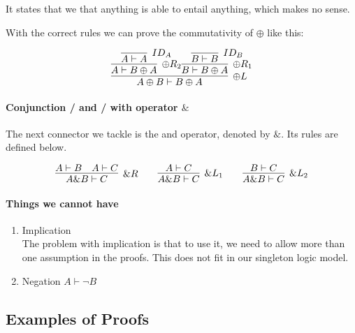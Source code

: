 \documentclass{article}
\begin{document}
It states that we that anything is able to entail anything, which makes no sense.

\medskip

With the correct rules we can prove  the commutativity of \(\oplus\) like this:

\[
\infer[{\oplus L}]
{A \oplus B \vdash B \oplus A}
{
	\infer[{\oplus R_2}]
	{A \vdash B \oplus A}
	{
		\infer[{ID_A}]
		{A \vdash A}
		{}
	}
	\infer[{\oplus R_1}]
	{B \vdash B \oplus A}
	{
		\infer[{ID_B}]
		{B \vdash B}
		{}
	}
}
\]



\paragraph{Conjunction / and / with operator \(\&\)}
The next connector we tackle is the and operator, denoted by \(\&\). Its rules are defined below. 

\[
\infer[{ \& R}]
{A \& B \vdash C}
{A \vdash B & A \vdash C}
\qquad
\infer[{\& L_1}]
{A \& B \vdash C}
{A \vdash C}
\qquad
\infer[{\& L_2}]
{A \& B \vdash C}
{B \vdash C}
\]


\paragraph{Things we cannot have}
\begin{enumerate}
	\item Implication \\
	      The problem with implication is that to use it, we need to allow 
	      more than one assumption in the proofs. This does not fit in our
	      singleton logic model.
	\item Negation \(A \vdash \neg B\)
\end{enumerate}





\subsection{Examples of Proofs}
\end{document}
